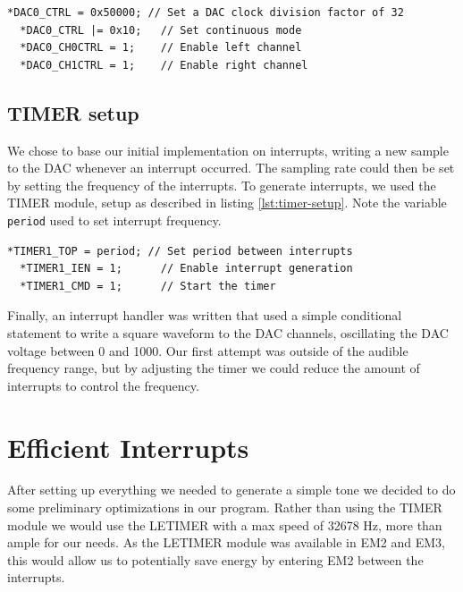 \noindent\begin{minipage}[c]{\textwidth}
  \begin{lstlisting}[caption=Setting up the DAC,label={lst:dac-setup}]
  *DAC0_CTRL = 0x50000; // Set a DAC clock division factor of 32
  *DAC0_CTRL |= 0x10;   // Set continuous mode
  *DAC0_CH0CTRL = 1;    // Enable left channel
  *DAC0_CH1CTRL = 1;    // Enable right channel
  \end{lstlisting}
\end{minipage}

\subsection{TIMER setup}
We chose to base our initial implementation on interrupts, writing a new sample to the DAC whenever an interrupt occurred. The sampling rate could then be set by setting the frequency of the interrupts. To generate interrupts, we used the TIMER module, setup as described in listing \ref{lst:timer-setup}. Note the variable \texttt{period} used to set interrupt frequency. \\

\noindent\begin{minipage}[c]{\textwidth}
  \begin{lstlisting}[caption=Setting up the timer to generate interrupts,label={lst:timer-setup}]
  *TIMER1_TOP = period; // Set period between interrupts
  *TIMER1_IEN = 1;      // Enable interrupt generation
  *TIMER1_CMD = 1;      // Start the timer
  \end{lstlisting}
\end{minipage}

Finally, an interrupt handler was written that used a simple conditional statement to write a square waveform to the DAC channels, oscillating the DAC voltage between 0 and 1000. Our first attempt was outside of the audible frequency range, but by adjusting the timer we could reduce the amount of interrupts to control the frequency.


\section{Efficient Interrupts}
After setting up everything we needed to generate a simple tone we decided to do some preliminary optimizations in our program. Rather than using the TIMER module we would use the LETIMER with a max speed of 32678 Hz, more than ample for our needs. As the LETIMER module was available in EM2 and EM3, this would allow us to potentially save energy by entering EM2 between the interrupts. \\

